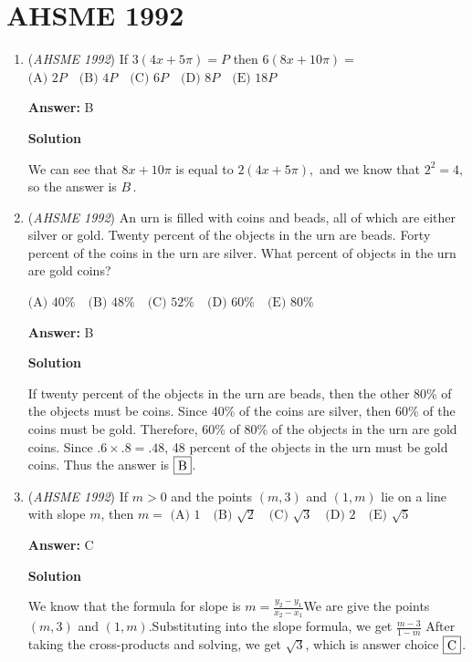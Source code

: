 \section{AHSME 1992}
        \begin{enumerate}
        	\item (\textit{AHSME 1992}) If $3(4x+5\pi)=P$ then $6(8x+10\pi)=$
$\text{(A) } 2P\quad \text{(B) } 4P\quad \text{(C) } 6P\quad \text{(D) } 8P\quad \text{(E) } 18P$

 \textbf{Answer: }B



\textbf{Solution}

We can see that $8x+10\pi$ is equal to $2(4x+5\pi),$ and we know that $2^2 = 4,$ so the answer is $\boxed{B}\, .$



	\item (\textit{AHSME 1992}) An urn is filled with coins and beads, all of which are either silver or gold. Twenty percent of the objects in the urn are beads. Forty percent of the coins in the urn are silver. What percent of objects in the urn are gold coins?


 $\text{(A) } 40\%\quad \text{(B) } 48\%\quad \text{(C) } 52\%\quad \text{(D) } 60\%\quad \text{(E) } 80\%$

 \textbf{Answer: }B



\textbf{Solution}

If twenty percent of the objects in the urn are beads, then the other $80$\% of the objects must be coins. Since $40$\% of the coins are silver, then $60$\% of the coins must be gold. Therefore, $60$\% of $80$\% of the objects in the urn are gold coins. Since $.6\times.8=.48$, 48 percent of the objects in the urn must be gold coins. Thus the answer is $\fbox{B}$.

 


	\item (\textit{AHSME 1992}) If $m>0$ and the points $(m,3)$ and $(1,m)$ lie on a line with slope $m$, then $m=$
$\text{(A) } 1\quad \text{(B) } \sqrt{2}\quad \text{(C) } \sqrt{3}\quad \text{(D) } 2\quad \text{(E) } \sqrt{5}$

 \textbf{Answer: }C



\textbf{Solution}

We know that the formula for slope is $m = \frac{y_2-y_1}{x_2-x_1}$We are give the points $(m,3)$ and $(1,m)$.Substituting into the slope formula, we get $\frac{m-3}{1-m}$ After taking the cross-products and solving, we get $\sqrt{3}$, which is answer choice $\fbox{C}$.


\end{enumerate}
